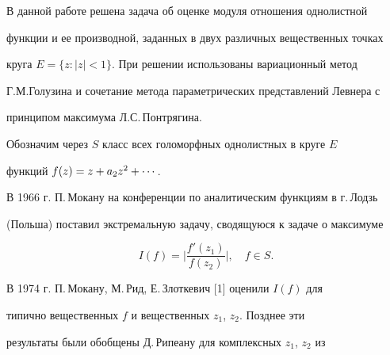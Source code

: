 \date{}







\pagestyle{plain} %













\maketitle


\label{begin}





В данной работе решена задача об оценке модуля отношения однолистной


функции и ее производной, заданных в двух различных вещественных точках


круга $E=\{z: |z|<1\} $. При решении использованы вариационный метод


Г.М.Голузина и сочетание метода параметрических представлений Левнера с


принципом максимума Л.С.\,Понтрягина.





Обозначим через $S$ класс всех голоморфных однолистных в круге $E$


функций $f(z)=\linebreak z + a_2z^2 +\dotsb$.





В 1966 г. П.\,Мокану на конференции по аналитическим функциям в г.\,Лодзь


(Польша) поставил экстремальную задачу, сводящуюся к задаче о максимуме


$$


I(f) =\biggl|\frac{f'(z_1)}{f(z_2)}\biggr|, \quad  f\in S.


$$


В 1974 г. П.\,Мокану, М.\,Рид, Е.\,Злоткевич [1] оценили $I(f)$ для


типично вещественных $f$ и вещественных $z_1$, $z_2$. Позднее эти


результаты были обобщены Д.\,Рипеану для комплексных $z_1$, $z_2$ из


